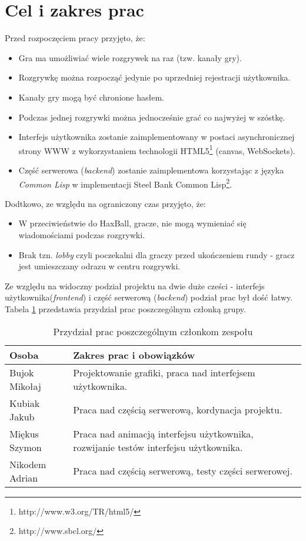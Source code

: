 \section{Cel i zakres prac}
Przed rozpoczęciem pracy przyjęto, że:
\begin{itemize}\itemsep0em
  \item Gra ma umożliwiać wiele rozgrywek na raz (tzw. kanały gry).
  \item Rozgrywkę można rozpocząć jedynie po uprzedniej rejestracji użytkownika.
  \item Kanały gry mogą być chronione hasłem.
  \item Podczas jednej rozgrywki można jednocześnie grać co najwyżej w szóstkę.
  \item Interfejs użytkownika zostanie zaimplementowany w postaci asynchronicznej strony WWW z wykorzystaniem technologii HTML5\footnote{http://www.w3.org/TR/html5/} (canvas, WebSockets).
  \item Część serwerowa (\emph{backend}) zostanie zaimplementowa korzystając z języka \emph{Common Lisp} w implementacji Steel Bank Common Lisp\footnote{http://www.sbcl.org/}.
\end{itemize}
Dodtkowo, ze względu na ograniczony czas przyjęto, że:
\begin{itemize}
  \item W przeciwieństwie do HaxBall, gracze, nie mogą wymieniać się wiadomościami podczas rozgrywki.
  \item Brak tzn. \emph{lobby} czyli poczekalni dla graczy przed ukończeniem rundy - gracz jest umieszczany odrazu w centru rozgrywki.
\end{itemize}

Ze względu na widoczny podział projektu na dwie duże cześci - interfejs użytkownika(\emph{frontend}) i część serwerową (\emph{backend}) podział prac był dość łatwy. Tabela \ref{tab:podzial} przedstawia przydział prac poszczególnym członką grupy.

\begin{table}[h]
  \centering
  \begin{tabular}{ |l|p{8cm}| }
    \hline
    Osoba & Zakres prac i obowiązków \\ \hline
    Bujok Mikołaj &

    Projektowanie grafiki, praca nad interfejsem użytkownika.\\
    Kubiak Jakub & Praca nad częścią serwerową,  kordynacja projektu.\\
    Miękus Szymon & Praca nad animacją interfejsu użytkownika, rozwijanie testów interfejsu użytkownika. \\
    Nikodem Adrian &  Praca nad częścią serwerową, testy części serwerowej.\\
    \hline
  \end{tabular}
  \caption{Przydział prac poszczególnym członkom zespołu}
  \label{tab:podzial}
\end{table}
